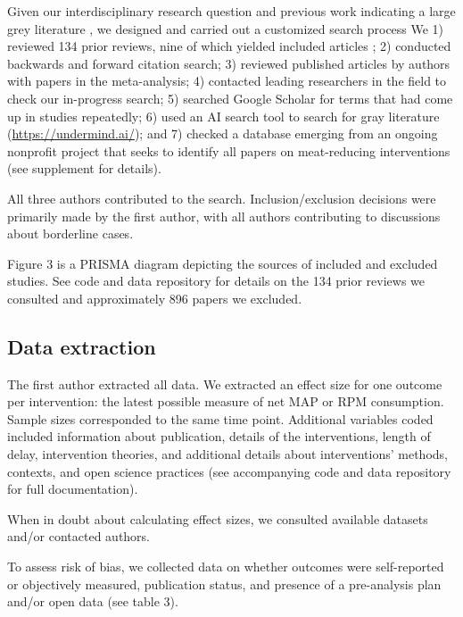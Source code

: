 \documentclass[sn-nature,referee,pdflatex]{sn-jnl}
\begin{document}
Given our interdisciplinary research question and previous work
indicating a large grey literature \citep{mathur2021meta}, we designed
and carried out a customized search process We 1) reviewed 134 prior
reviews, nine of which yielded included articles
\citep{mathur2021meta, bianchi2018conscious, bianchi2018restructuring, ammann2023, chang2023, DiGennaro2024, harguess2020, ronto2022, wynes2018};
2) conducted backwards and forward citation search; 3) reviewed
published articles by authors with papers in the meta-analysis; 4)
contacted leading researchers in the field to check our in-progress
search; 5) searched Google Scholar for terms that had come up in studies
repeatedly; 6) used an AI search tool to search for gray literature
(\url{https://undermind.ai/}); and 7) checked a database emerging from
an ongoing nonprofit project that seeks to identify all papers on
meat-reducing interventions (see supplement for details).

All three authors contributed to the search. Inclusion/exclusion
decisions were primarily made by the first author, with all authors
contributing to discussions about borderline cases.

Figure 3 is a PRISMA diagram depicting the sources of included and
excluded studies. See code and data repository for details on the 134
prior reviews we consulted and approximately 896 papers we excluded.

\subsection{Data extraction}\label{sec3.3}

The first author extracted all data. We extracted an effect size for one
outcome per intervention: the latest possible measure of net MAP or RPM
consumption. Sample sizes corresponded to the same time point.
Additional variables coded included information about publication,
details of the interventions, length of delay, intervention theories,
and additional details about interventions' methods, contexts, and open
science practices (see accompanying code and data repository for full
documentation).

When in doubt about calculating effect sizes, we consulted available
datasets and/or contacted authors.

To assess risk of bias, we collected data on whether outcomes were
self-reported or objectively measured, publication status, and presence
of a pre-analysis plan and/or open data (see table 3).
\end{document}
